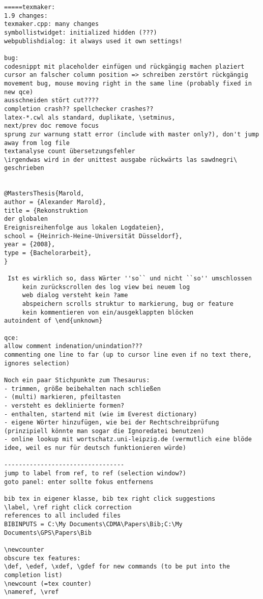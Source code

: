 \documentclass[10pt,a4paper,landscape]{report}
\begin{document}
\begin{verbatim}
=====texmaker: 
1.9 changes:
texmaker.cpp: many changes
symbollistwidget: initialized hidden (???)
webpublishdialog: it always used it own settings!

bug: 
codesnippt mit placeholder einfügen und rückgängig machen plaziert cursor an falscher column position => schreiben zerstört rückgängig
movement bug, mouse moving right in the same line (probably fixed in new qce)
ausschneiden stört cut????
completion crash?? spellchecker crashes??
latex-*.cwl als standard, duplikate, \setminus, 
next/prev doc remove focus
sprung zur warnung statt error (include with master only?), don't jump away from log file
textanalyse count übersetzungsfehler
\irgendwas wird in der unittest ausgabe rückwärts las sawdnegri\ geschrieben


@MastersThesis{Marold,
author = {Alexander Marold},
title = {Rekonstruktion 
der globalen 
Ereignisreihenfolge aus lokalen Logdateien},
school = {Heinrich-Heine-Universität Düsseldorf},
year = {2008},
type = {Bachelorarbeit},
}

 Ist es wirklich so, dass Wärter ''so`` und nicht ``so'' umschlossen
     kein zurückscrollen des log view bei neuem log
     web dialog versteht kein ?ame
     abspeichern scrolls struktur to markierung, bug or feature
     kein kommentieren von ein/ausgeklappten blöcken
autoindent of \end{unknown}

qce:
allow comment indenation/unindation???
commenting one line to far (up to cursor line even if no text there, ignores selection)

Noch ein paar Stichpunkte zum Thesaurus:
- trimmen, größe beibehalten nach schließen
- (multi) markieren, pfeiltasten
- versteht es deklinierte formen?
- enthalten, startend mit (wie im Everest dictionary)
- eigene Wörter hinzufügen, wie bei der Rechtschreibprüfung (prinzipiell könnte man sogar die Ignoredatei benutzen)
- online lookup mit wortschatz.uni-leipzig.de (vermutlich eine blöde idee, weil es nur für deutsch funktionieren würde)

---------------------------------
jump to label from ref, to ref (selection window?)
goto panel: enter sollte fokus entfernens

bib tex in eigener klasse, bib tex right click suggestions
\label, \ref right click correction
references to all included files
BIBINPUTS = C:\My Documents\CDMA\Papers\Bib;C:\My Documents\GPS\Papers\Bib

\newcounter
obscure tex features:
\def, \edef, \xdef, \gdef for new commands (to be put into the completion list)
\newcount (=tex counter)
\nameref, \vref


\end{verbatim}
\end{document}
